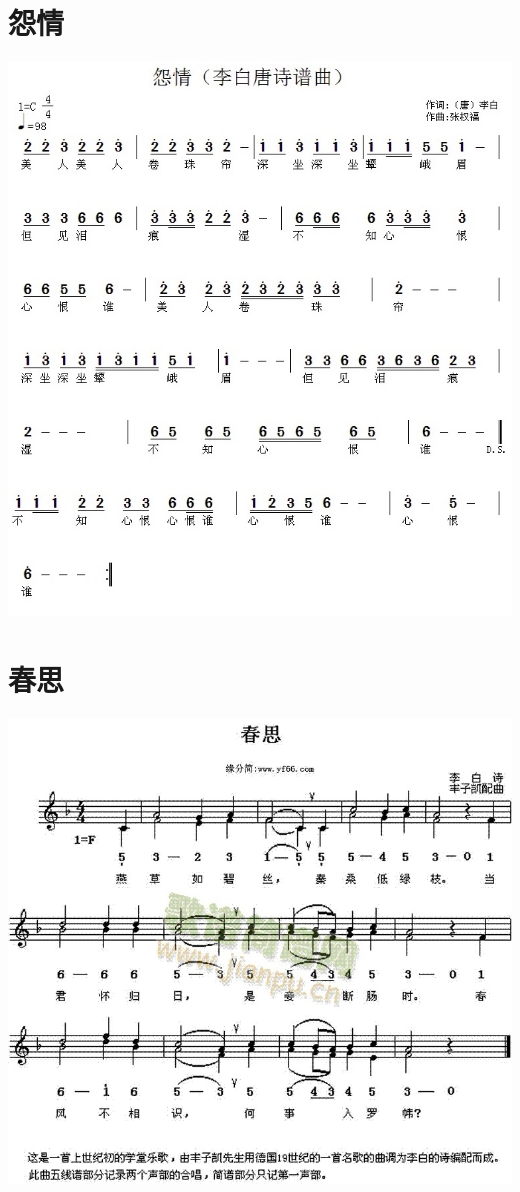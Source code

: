 \documentclass[cn,pad,twocol]{elegantbook}
\begin{document}
\section{怨情}
    \includegraphics[width=\textwidth]{dongxiao/20200808-怨情-李白.jpg}
\section{春思}
    \includegraphics[width=\textwidth]{dongxiao/20200808-春思-李白.jpg}
\end{document}
